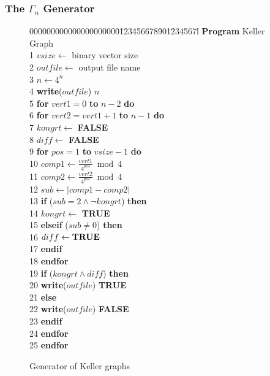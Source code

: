 \subsubsection{The $\Gamma_{n}$ Generator}
\begin{figure}
{\footnotesize
\begin{tabbing}
00000000000000000000\=0\=123\=456\=678\=901\=234\=567\=l \+ \+ \kill
 \< {\bf Program} Keller Graph \\
 1 \> $vsize \leftarrow$  binary vector size \\
 2 \> $outfile \leftarrow$ output file name \\
 3 \> $n \leftarrow 4^{n}$ \\
 4 \> {\bf write}($outfile$)  $n$ \\
 5 \> {\bf for} $vert1 = 0$ {\bf to} $n-2$ {\bf do} \\
 6 \> \> {\bf for} $vert2 = vert1+1$ {\bf to} $n-1$ {\bf do} \\
 7 \> \> \> $kongrt \leftarrow$ {\bf FALSE} \\
 8 \> \> \> $diff \leftarrow$ {\bf FALSE} \\
 9 \> \> \> {\bf for} $pos = 1$ {\bf to} $vsize-1$ {\bf do} \- \\
10 \> \> \> \> \> $comp1 \leftarrow {\frac{vert1}{4^{pos}} \bmod 4}$ \\
11 \> \> \> \> \> $comp2 \leftarrow {\frac{vert2}{4^{pos}} \bmod 4}$ \\
12 \> \> \> \> \> $sub \leftarrow \left| comp1-comp2 \right|$ \\
13 \> \> \> \> \> {\bf if} ($sub = 2 \wedge \neg kongrt$) {\bf then} \\
14 \> \> \> \> \> \> $kongrt \leftarrow$ {\bf TRUE} \\
15 \> \> \> \> \> {\bf elseif} ($sub \neq 0$) {\bf then} \\
16 \> \> \> \> \> \> $diff \leftarrow {\bf TRUE}$ \\
17 \> \> \> \> \> {\bf endif} \\
18 \> \> \> \> {\bf endfor} \\
19 \> \> \> \> {\bf if} ($kongrt \wedge diff$) {\bf then} \\
20 \> \> \> \> \> {\bf write}($outfile$) {\bf TRUE} \\
21 \> \> \> \> {\bf else} \\
22 \> \> \> \> \> {\bf write}($outfile$) {\bf FALSE} \\
23 \> \> \> \> {\bf endif} \\
24 \> \> \> {\bf endfor} \\
25 \> \> {\bf endfor} \\
\end{tabbing}
}
\caption{Generator of Keller graphs}
\label{alg:kell}
\end{figure}

